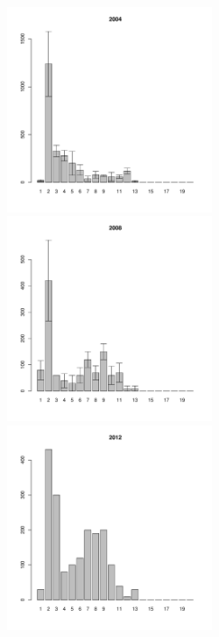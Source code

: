 \begin{figure}[h]

\begin{multicols}{3}
\hfill
\includegraphics[width=60mm]{../White_Sea/Luvenga_Goreliy/high_2004_.pdf}
\hfill
\includegraphics[width=60mm]{../White_Sea/Luvenga_Goreliy/high_2008_.pdf}
\hfill
\includegraphics[width=60mm]{../White_Sea/Luvenga_Goreliy/high_2012_.pdf}
\end{multicols}




\end{figure}
